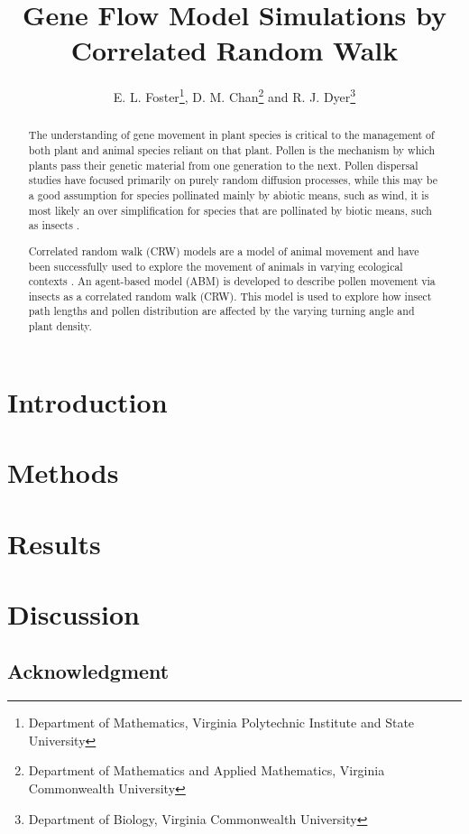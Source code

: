 \documentclass{article}
\title{Gene Flow Model Simulations by Correlated Random Walk}
\author{E. L. Foster\thanks{Department of Mathematics, Virginia Polytechnic Institute and State
University}, D. M. Chan\thanks{Department of Mathematics and Applied Mathematics, Virginia
Commonwealth University} and R. J. Dyer\thanks{Department of Biology, Virginia Commonwealth
University}}
\begin{document}
\maketitle

\begin{abstract} 
  The understanding of gene movement in plant species is critical to the management
  of both plant and animal species reliant on that plant.  Pollen is the mechanism by which plants
  pass their genetic material from one generation to the next. Pollen dispersal studies have focused
  primarily on purely random diffusion processes, while this may be a good assumption for species
  pollinated mainly by abiotic means, such as wind, it is most likely an over simplification for
  species that are pollinated by biotic means, such as insects \cite{Chan}.

  Correlated random walk (CRW) models are a model of animal movement \cite{Prasad05} and have been
  successfully used to explore the movement of animals in varying ecological contexts
  \cite{Bartumeus07}. An agent-based model (ABM) is developed to describe pollen movement via insects
  as a correlated random walk (CRW). This model is used to explore how insect path lengths and pollen
  distribution are affected by the varying turning angle and plant density.  
\end{abstract}

\section{Introduction}
  
\section{Methods}
  
\section{Results}
  
\section{Discussion}
  
\subsection*{Acknowledgment}


\end{document}
